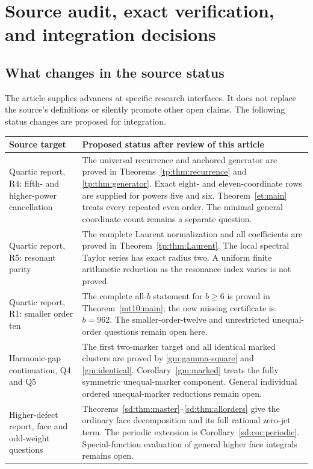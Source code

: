 \section{Source audit, exact verification, and integration decisions}
\label{sec:audit}

\subsection{What changes in the source status}

The article supplies advances at specific research interfaces. It does
not replace the source's definitions or silently promote other open
claims. The following status changes are proposed for integration.

\begingroup
\small
\begin{longtable}{@{}p{}p{}@{}}
\toprule
Source target & Proposed status after review of this article\\
\midrule
\endhead
Quartic report, R4: fifth- and higher-power cancellation &
The universal recurrence and anchored generator are proved in
Theorems~\ref{tp:thm:recurrence} and \ref{tp:thm:generator}. Exact
eight- and eleven-coordinate rows are supplied for powers five and six.
Theorem~\ref{et:main} treats every repeated even order. The minimal
general coordinate count remains a separate question.\\[5pt]
Quartic report, R5: resonant parity &
The complete Laurent normalization and all coefficients are proved in
Theorem~\ref{tp:thm:Laurent}. The local spectral Taylor series has exact
radius two. A uniform finite arithmetic reduction as the resonance
index varies is not proved.\\[5pt]
Quartic report, R1: smaller order ten &
The complete all-$b$ statement for $b\ge6$ is proved in
Theorem~\ref{mt10:main}; the new missing certificate is $b=962$.
The smaller-order-twelve and unrestricted unequal-order questions remain
open here.\\[5pt]
Harmonic-gap continuation, Q4 and Q5 &
The first two-marker target and all identical marked clusters are
proved by \eqref{gm:gamma-square} and \eqref{gm:identical}.
Corollary~\ref{gm:marked} treats the fully symmetric unequal-marker
component. General individual ordered unequal-marker reductions remain
open.\\[5pt]
Higher-defect report, face and odd-weight questions &
Theorems~\ref{sd:thm:master}--\ref{sd:thm:allorders} give the ordinary
face decomposition and its full rational zero-jet term. The periodic
extension is Corollary~\ref{sd:cor:periodic}. Special-function evaluation
of general higher face integrals remains open.\\
\bottomrule
\end{longtable}
\endgroup

